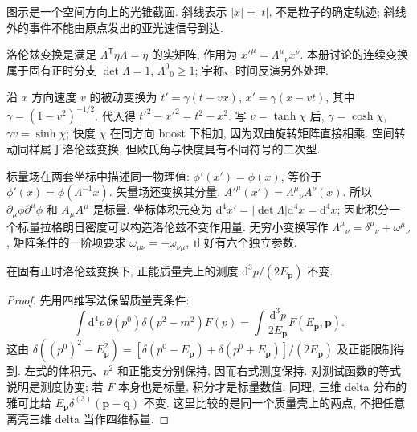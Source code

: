 \begin{center}
\end{center}
图示是一个空间方向上的光锥截面. 斜线表示 $|x|=|t|$, 不是粒子的确定轨迹; 斜线外的事件不能由原点发出的亚光速信号到达.

\begin{definition}
洛伦兹变换是满足 $\Lambda^{\mathsf T}\eta\Lambda=\eta$ 的实矩阵, 作用为 $x'^\mu=\Lambda^\mu{}_{\nu}x^\nu$. 本册讨论的连续变换属于固有正时分支 $\det\Lambda=1$, $\Lambda^0{}_0\ge1$; 宇称、时间反演另外处理.
\end{definition}
沿 $x$ 方向速度 $v$ 的被动变换为 $t'=\gamma(t-vx)$, $x'=\gamma(x-vt)$, 其中 $\gamma=(1-v^2)^{-1/2}$. 代入得 $t'^2-x'^2=t^2-x^2$. 写 $v=\tanh\chi$ 后, $\gamma=\cosh\chi$, $\gamma v=\sinh\chi$; 快度 $\chi$ 在同方向 boost 下相加, 因为双曲旋转矩阵直接相乘. 空间转动同样属于洛伦兹变换, 但欧氏角与快度具有不同符号的二次型.

标量场在两套坐标中描述同一物理值: $\phi'(x')=\phi(x)$, 等价于 $\phi'(x)=\phi(\Lambda^{-1}x)$. 矢量场还变换其分量, $A'^\mu(x')=\Lambda^\mu{}_{\nu}A^\nu(x)$. 所以 $\partial_\mu\phi\partial^\mu\phi$ 和 $A_\mu A^\mu$ 是标量. 坐标体积元变为 $\mathrm d^4x'=|\det\Lambda|\mathrm d^4x=\mathrm d^4x$; 因此积分一个标量拉格朗日密度可以构造洛伦兹不变作用量. 无穷小变换写作 $\Lambda^\mu{}_{\nu}=\delta^\mu{}_{\nu}+\omega^\mu{}_{\nu}$, 矩阵条件的一阶项要求 $\omega_{\mu\nu}=-\omega_{\nu\mu}$, 正好有六个独立参数.

\begin{proposition}\label{prop:mass-shell-measure}
在固有正时洛伦兹变换下, 正能质量壳上的测度 $\mathrm d^3p/(2E_{\mathbf p})$ 不变.
\end{proposition}
\begin{proof}
先用四维写法保留质量壳条件:
\[
\int \mathrm d^4p\,\theta(p^0)\delta(p^2-m^2)F(p)
=\int\frac{\mathrm d^3p}{2E_{\mathbf p}}F(E_{\mathbf p},\mathbf p).
\]
这由 $\delta((p^0)^2-E_{\mathbf p}^2)=[\delta(p^0-E_{\mathbf p})+\delta(p^0+E_{\mathbf p})]/(2E_{\mathbf p})$ 及正能限制得到. 左式的体积元、$p^2$ 和正能支分别保持, 因而右式测度保持. 对测试函数的等式说明是测度协变; 若 $F$ 本身也是标量, 积分才是标量数值. 同理, 三维 delta 分布的雅可比给 $E_{\mathbf p}\delta^{(3)}(\mathbf p-\mathbf q)$ 不变. 这里比较的是同一个质量壳上的两点, 不把任意离壳三维 delta 当作四维标量.
\end{proof}

